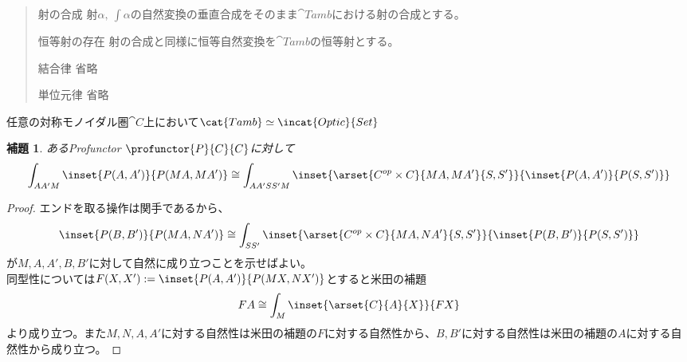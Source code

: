 \documentclass[uplatex,dvipdfmx]{jsarticle}
\newtheorem{lemma}[proof]{補題}
\begin{document}
\begin{define}[丹原加群の圏]
\begin{quote}
\begin{mydescription}
\begin{center}
        \end{center}
          
				\item[射の合成]射$\alpha,\ \int\alpha$の自然変換の垂直合成をそのまま$\cat{Tamb}$における射の合成とする。
				\item[恒等射の存在]
				射の合成と同様に恒等自然変換を$\cat{Tamb}$の恒等射とする。
				\item[結合律] 省略
				\item[単位元律] 省略
			\end{mydescription}
		\end{quote}
  \end{define}
  \begin{prop}[丹原Double圏同値]
    任意の対称モノイダル圏$\cat{C}$上において$\cat{Tamb}\simeq\incat{Optic}{Set}$
  \end{prop}
  \begin{lemma}あるProfunctor $\profunctor{P}{C}{C}$に対して
    \[\int_{AA'M}\inset{P(A,A')}{P(MA,MA')}\cong\int_{AA'SS'M}\inset{\arset{C^{op}\times C}{MA, MA'}{S,S'}}{\inset{P(A,A')}{P(S,S')}}\]
  \end{lemma}
  \begin{proof}
    エンドを取る操作は関手であるから、
    \[\inset{P(B,B')}{P(MA,NA')}\cong\int_{SS'}\inset{\arset{C^{op}\times C}{MA, NA'}{S,S'}}{\inset{P(B,B')}{P(S,S')}}\]が$M,A,A',B,B'$に対して自然に成り立つことを示せばよい。\\
    同型性については$F(X,X'):=\inset{P(A,A')}{P(MX,NX')}$とすると米田の補題\[FA\cong\int_M \inset{\arset{C}{A}{X}}{FX}\]より成り立つ。また$M,N,A,A'$に対する自然性は米田の補題の$F$に対する自然性から、$B,B'$に対する自然性は米田の補題の$A$に対する自然性から成り立つ。
  \end{proof}
\end{document}
